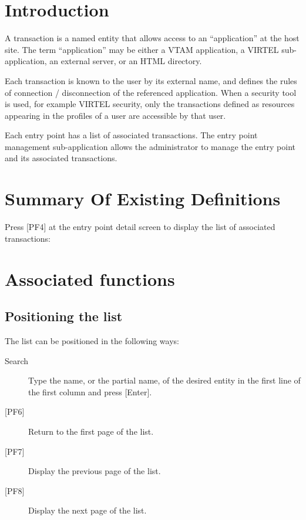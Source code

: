 \documentclass[letterpaper,10pt,english]{sphinxmanual}
\begin{document}
\section{Introduction}
\label{\detokenize{connectivity_guide:id12}}
A transaction is a named entity that allows access to an “application” at the host site. The term “application” may be either a VTAM application, a VIRTEL sub-application, an external server, or an HTML directory.

Each transaction is known to the user by its external name, and defines the rules of connection / disconnection of the referenced application. When a security tool is used, for example VIRTEL security, only the transactions defined as resources appearing in the profiles of a user are accessible by that user.

Each entry point has a list of associated transactions. The entry point management sub-application allows the administrator to manage the entry point and its associated transactions.


\section{Summary Of Existing Definitions}
\label{\detokenize{connectivity_guide:id13}}
Press {[}PF4{]} at the entry point detail screen to display the list of associated transactions:



\section{Associated functions}
\label{\detokenize{connectivity_guide:id14}}

\subsection{Positioning the list}
\label{\detokenize{connectivity_guide:id15}}
The list can be positioned in the following ways:
\begin{description}
\item[{Search}] \leavevmode
Type the name, or the partial name, of the desired entity in the first line of the first column and press {[}Enter{]}.

\item[{{[}PF6{]}}] \leavevmode
Return to the first page of the list.

\item[{{[}PF7{]}}] \leavevmode
Display the previous page of the list.

\item[{{[}PF8{]}}] \leavevmode
Display the next page of the list.

\end{description}
\end{document}
